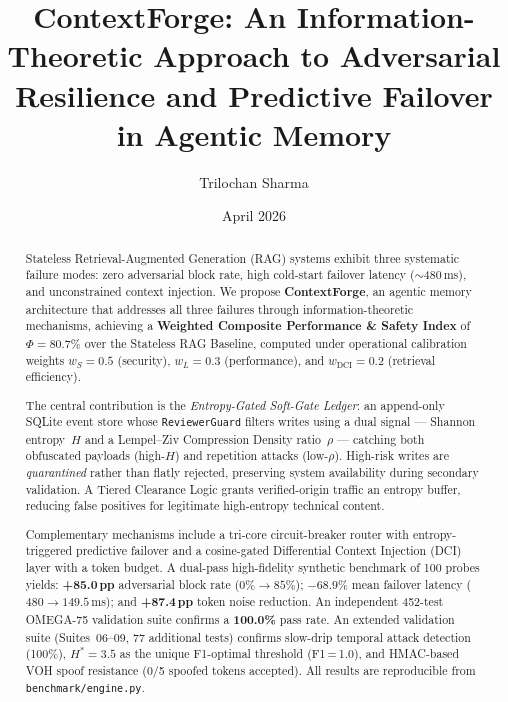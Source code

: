 \documentclass[11pt,twocolumn]{article}
\title{%
  \textbf{ContextForge: An Information-Theoretic Approach to
    Adversarial Resilience and Predictive Failover in
    Agentic Memory}%
}
\author[1]{Trilochan Sharma}
\affil[1]{Independent Researcher, \texttt{parnishklpo@gmail.com}}
\date{April 2026}
\begin{document}
\maketitle

\begin{abstract}
Stateless Retrieval-Augmented Generation (RAG) systems exhibit three
systematic failure modes: zero adversarial block rate, high cold-start
failover latency ($\sim$480\,ms), and unconstrained context injection.
We propose \textbf{ContextForge}, an agentic memory architecture that
addresses all three failures through information-theoretic mechanisms,
achieving a \textbf{Weighted Composite Performance \& Safety Index} of
$\Phi = \mathbf{80.7\%}$ over the Stateless RAG Baseline, computed under
operational calibration weights $w_S=0.5$ (security), $w_L=0.3$
(performance), and $w_\text{DCI}=0.2$ (retrieval efficiency).

The central contribution is the \emph{Entropy-Gated Soft-Gate Ledger}:
an append-only SQLite event store whose \texttt{ReviewerGuard} filters
writes using a dual signal --- Shannon entropy~$H$ and a Lempel--Ziv
Compression Density ratio~$\rho$ --- catching both obfuscated payloads
(high-$H$) and repetition attacks (low-$\rho$). High-risk writes are
\emph{quarantined} rather than flatly rejected, preserving system
availability during secondary validation. A Tiered Clearance Logic
grants verified-origin traffic an entropy buffer, reducing false
positives for legitimate high-entropy technical content.

Complementary mechanisms include a tri-core circuit-breaker router
with entropy-triggered predictive failover and a cosine-gated
Differential Context Injection (DCI) layer with a token budget.
A dual-pass high-fidelity synthetic benchmark of 100 probes yields:
\textbf{+85.0\,pp} adversarial block rate ($0\% \to 85\%$);
\textbf{$-68.9\%$} mean failover latency ($480 \to 149.5$\,ms); and
\textbf{+87.4\,pp} token noise reduction. An independent 452-test
OMEGA-75 validation suite confirms a \textbf{100.0\%} pass rate. An extended validation
suite (Suites~06--09, 77 additional tests) confirms slow-drip
temporal attack detection (100\%), $H^{*}\!=\!3.5$ as the unique
F1-optimal threshold (F1\,=\,1.0), and HMAC-based VOH spoof
resistance (0/5 spoofed tokens accepted).
All results are reproducible from \texttt{benchmark/engine.py}.
\end{abstract}

\end{document}
